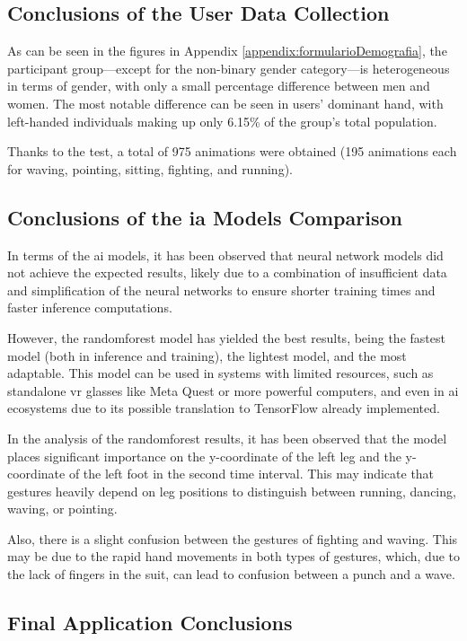 \subsection{Conclusions of the User Data Collection}

As can be seen in the figures in Appendix \ref{appendix:formularioDemografia}, the participant group—except for the non-binary gender category—is heterogeneous in terms of gender, with only a small percentage difference between men and women.
The most notable difference can be seen in users' dominant hand, with left-handed individuals making up only 6.15\% of the group’s total population.

Thanks to the test, a total of 975 animations were obtained (195 animations each for waving, pointing, sitting, fighting, and running).

\subsection{Conclusions of the \gls{ia} Models Comparison}

In terms of the \gls{ai} models, it has been observed that neural network models did not achieve the expected results, likely due to a combination of insufficient data and simplification of the neural networks to ensure shorter training times and faster inference computations.

However, the \gls{randomforest} model has yielded the best results, being the fastest model (both in inference and training), the lightest model, and the most adaptable. This model can be used in systems with limited resources, such as standalone \gls{vr} glasses like Meta Quest or more powerful computers, and even in \gls{ai} ecosystems due to its possible translation to TensorFlow already implemented.

In the analysis of the \gls{randomforest} results, it has been observed that the model places significant importance on the y-coordinate of the left leg and the y-coordinate of the left foot in the second time interval. This may indicate that gestures heavily depend on leg positions to distinguish between running, dancing, waving, or pointing.

Also, there is a slight confusion between the gestures of fighting and waving. This may be due to the rapid hand movements in both types of gestures, which, due to the lack of fingers in the suit, can lead to confusion between a punch and a wave.

\subsection{Final Application Conclusions}

